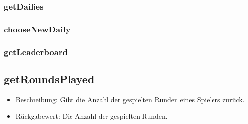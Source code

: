 \documentclass[a4paper]{scrreprt}
\begin{document}
   \subsubsection{getDailies}
   \subsubsection{chooseNewDaily}
   \subsubsection{getLeaderboard}
   \subsection{getRoundsPlayed}
   \begin{itemize}
   	\item Beschreibung: Gibt die Anzahl der gespielten Runden eines Spielers zurück.
   	\item Rückgabewert: Die Anzahl der gespielten Runden.
   \end{itemize}
   
   
\end{document}
